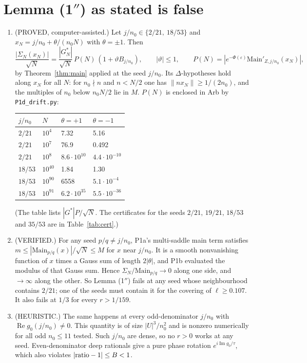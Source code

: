 \documentclass[11pt]{article}
\theoremstyle{definition}\newtheorem{definition}[theorem]{Definition}
\theoremstyle{remark}\newtheorem{remark}[theorem]{Remark}
\begin{document}
\section{Lemma (1$''$) as stated is false}
\begin{proposition}\label{prop:false}
\begin{enumerate}
\item[(i)] (PROVED, computer-assisted.) Let $j/n_0\in\{2/21,\ 18/53\}$ and $x_N=j/n_0+\theta/(n_0N)$ with $\theta=\pm1$. Then
\[\frac{|\Sigma_N(x_N)|}{\sqrt N}=\frac{|G^*_N|}{\sqrt N}\,P(N)\,(1+\vartheta B_{j/n_0}),\qquad |\vartheta|\le1,\qquad P(N)=|e^{-\Phi(\varepsilon)}\mathrm{Main}'_{Z,j/n_0}(x_N)|,\]
by Theorem~\ref{thm:main} applied at the seed $j/n_0$. Its $\Delta$-hypotheses hold along $x_N$ for all $N$: for $n_0\nmid n$ and $n<N/2$ one has $\|nx_N\|\ge1/(2n_0)$, and the multiples of $n_0$ below $n_0N/2$ lie in $M$.
$P(N)$ is enclosed in Arb by \texttt{P1d\_drift.py}:
\begin{center}\small
\begin{tabular}{llll}\toprule
$j/n_0$ & $N$ & $\theta=+1$ & $\theta=-1$\\\midrule
$2/21$ & $10^4$ & 7.32 & 5.16\\
$2/21$ & $10^7$ & 76.9 & 0.492\\
$2/21$ & $10^8$ & $8.6\cdot10^{10}$ & $4.4\cdot10^{-10}$\\
$18/53$ & $10^{40}$ & 1.84 & 1.30\\
$18/53$ & $10^{90}$ & 6558 & $5.1\cdot10^{-4}$\\
$18/53$ & $10^{91}$ & $6.2\cdot10^{35}$ & $5.5\cdot10^{-36}$\\\bottomrule
\end{tabular}
\end{center}
(The table lists $|G^*|P/\sqrt N$. The certificates for the seeds $2/21$, $19/21$, $18/53$ and $35/53$ are in Table~\ref{tab:cert}.)
\item[(ii)] (VERIFIED.) For any seed $p/q\ne j/n_0$, P1a's multi-saddle main term satisfies $m\le|\mathrm{Main}_{p/q}(x)|/\sqrt N\le M$ for $x$ near $j/n_0$. It is a smooth nonvanishing function of $x$ times a Gauss sum of length $2|\theta|$, and P1b evaluated the modulus of that Gauss sum. Hence $\Sigma_N/\mathrm{Main}_{p/q}\to0$ along one side, and $\to\infty$ along the other.
So Lemma (1$''$) fails at any seed whose neighbourhood contains $2/21$; one of the seeds must contain it for the covering of $\ell\ge0.107$. It also fails at $1/3$ for every $r>1/159$.
\item[(iii)] (HEURISTIC.) The same happens at every odd-denominator $j/n_0$ with $\operatorname{Re}g_0(j/n_0)\ne0$. This quantity is of size $|U|^3/n_0^2$ and is nonzero numerically for all odd $n_0\le11$ tested. Such $j/n_0$ are dense, so no $r>0$ works at any seed. Even-denominator deep rationals give a pure phase rotation $e^{i\operatorname{Im}g_0/\tau}$, which also violates $|{\rm ratio}-1|\le B<1$.
\end{enumerate}
\end{proposition}
\end{document}
